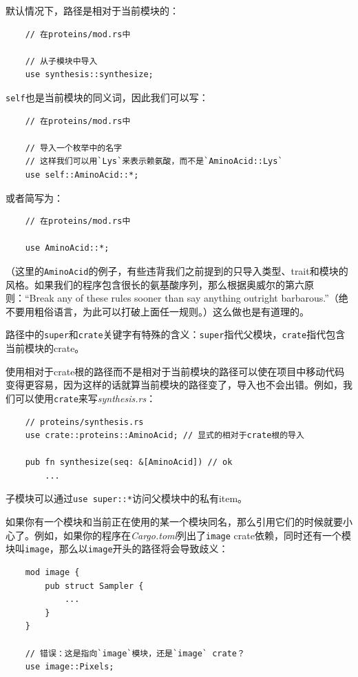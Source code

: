 默认情况下，路径是相对于当前模块的：
\begin{verbatim}
    // 在proteins/mod.rs中

    // 从子模块中导入
    use synthesis::synthesize;
\end{verbatim}

\texttt{self}也是当前模块的同义词，因此我们可以写：
\begin{verbatim}
    // 在proteins/mod.rs中

    // 导入一个枚举中的名字
    // 这样我们可以用`Lys`来表示赖氨酸，而不是`AminoAcid::Lys`
    use self::AminoAcid::*;
\end{verbatim}

或者简写为：
\begin{verbatim}
    // 在proteins/mod.rs中

    use AminoAcid::*;
\end{verbatim}

（这里的\texttt{AminoAcid}的例子，有些违背我们之前提到的只导入类型、trait和模块的风格。如果我们的程序包含很长的氨基酸序列，那么根据奥威尔的第六原则：“Break any of these rules sooner than say anything outright barbarous.”（绝不要用粗俗语言，为此可以打破上面任一规则。）这么做也是有道理的。

路径中的\texttt{super}和\texttt{crate}关键字有特殊的含义：\texttt{super}指代父模块，\texttt{crate}指代包含当前模块的crate。

使用相对于crate根的路径而不是相对于当前模块的路径可以使在项目中移动代码变得更容易，因为这样的话就算当前模块的路径变了，导入也不会出错。例如，我们可以使用\texttt{crate}来写\emph{synthesis.rs}：
\begin{verbatim}
    // proteins/synthesis.rs
    use crate::proteins::AminoAcid; // 显式的相对于crate根的导入

    pub fn synthesize(seq: &[AminoAcid]) // ok
        ...
\end{verbatim}

子模块可以通过\texttt{use super::*}访问父模块中的私有item。

如果你有一个模块和当前正在使用的某一个模块同名，那么引用它们的时候就要小心了。例如，如果你的程序在\emph{Cargo.toml}列出了\texttt{image} crate依赖，同时还有一个模块叫\texttt{image}，那么以\texttt{image}开头的路径将会导致歧义：
\begin{verbatim}
    mod image {
        pub struct Sampler {
            ...
        }
    }

    // 错误：这是指向`image`模块，还是`image` crate？
    use image::Pixels;
\end{verbatim}

